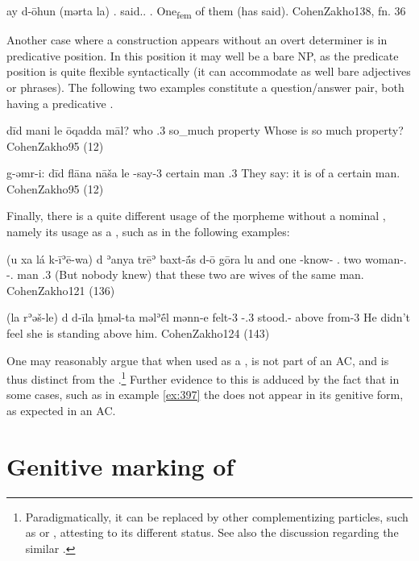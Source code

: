 {ay \zero{} d-ōhun (mərta \cb{}la)}
{.\fem{} \zero{} \pl{} said.\resl.\fem{} \cb{}\cop.\fem}
{One\textsubscript{fem} of them (has said).}
{CohenZakho}{138, fn. 36}


Another case where a \lnk* construction appears without an overt determiner is in predicative position. In this position it may well be a bare NP, as the predicate position is quite flexible syntactically (it can accommodate as well bare adjectives or  phrases). The following two examples constitute a question/answer pair, both having a predicative . 

{\zero{} dīd mani \cb{}le ōqadda māl? }
{\zero{} \lnkd{} who \cb{}\cop.3\masc{} so\_much property}
{Whose is so much property?}
{CohenZakho}{95 (12)}

{g-əmr-i: \zero{} dīd flāna nāša \cb{}le}
{\ind-say-3\pl{} \zero{} \lnkd{} certain man \cb{}\cop.3\masc}
{They say: it is of a certain man.}
{CohenZakho}{95 (12)}

Finally, there is a quite different usage of the \d morpheme without a nominal \prim, namely its usage as a , such as in the following examples:

{(u\cb{} xa lá\cb{} k-īʾē-wa) d\cb{} ʾanya trēʾ baxt-ā́s d-ō gōra \cb{}lu}
{and\cb{} one \neg\cb{} \ind-know-\pst{} \comp\cb{} \dem.\pl{} two woman-\pl.\cst{} \gen-\dem.\masc{} man \cb{}\cop.3\pl}
{(But nobody knew) that these two are wives of the same man.}
{CohenZakho}{121 (136)}

{(la rʾəš-le) d\cb{} d-īla ḥməl-ta məlʾḗl mənn-e}
	{\neg{} felt-3\masc{} \comp\cb{} \gen-\cop.3\fem{} stood.\resl-\fem{} above from-3\sg}
{He didn't feel she is standing above him.}
{CohenZakho}{124 (143)}

\largerpage
One may reasonably argue that when used as a ,  is not part of  an AC, and is thus distinct from the \lnk*.\footnote{Paradigmatically, it can be replaced by other complementizing particles, such as  or , attesting to its different status. See also the discussion regarding the similar \Syr {}.} Further evidence to this is adduced by the fact that in some cases, such as in example \ref{ex:397} the  does not appear in its genitive form, as expected in an AC. 

\section{Genitive marking of \secns} \label{ss:JZax_gen}


